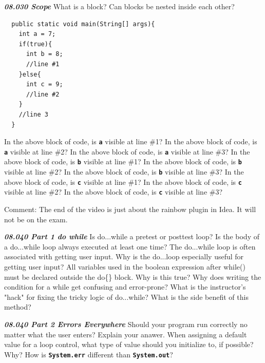 \documentclass[letterpaper,11pt]{exam}
\newcommand{\videoheading}[1]{\Large\textbf{\textit{#1}}}
\begin{document}
\begin{questions}
\videoheading{08.030 Scope}
\question What is a block?
\question Can blocks be nested inside each other?
\begin{samepage}
\begin{verbatim}
  public static void main(String[] args){
    int a = 7;
    if(true){
      int b = 8;
      //line #1
    }else{
      int c = 9;
      //line #2
    }
    //line 3
  }
\end{verbatim}
\question In the above block of code, is \texttt{\textbf{a}} visible at line \#1?
\question In the above block of code, is \texttt{\textbf{a}} visible at line \#2?
\question In the above block of code, is \texttt{\textbf{a}} visible at line \#3?
\question In the above block of code, is \texttt{\textbf{b}} visible at line \#1?
\question In the above block of code, is \texttt{\textbf{b}} visible at line \#2?
\question In the above block of code, is \texttt{\textbf{b}} visible at line \#3?
\question In the above block of code, is \texttt{\textbf{c}} visible at line \#1?
\question In the above block of code, is \texttt{\textbf{c}} visible at line \#2?
\question In the above block of code, is \texttt{\textbf{c}} visible at line \#3?
\end{samepage}

Comment:  The end of the video is just about the rainbow{} plugin in Idea.  It will not be on the exam.

\videoheading{08.040 Part 1 do while}
\question Is do...while a pretest or posttest loop?
\question Is the body of a do...while loop always executed at least one time?
\question The do...while loop is often associated with getting user input. Why is the do...loop especially useful for getting user input?
\question All variables used in the boolean expression after while() must be declared outside the do\{\} block.  Why is this true?
\vspace{1cm}
\question Why does writing the condition for a while get confusing and error-prone?
\question What is the instructor's "hack" for fixing the tricky logic of do...while?  What is the side benefit of this method?
\vspace{2cm}

\videoheading{08.040 Part 2 Errors Everywhere}
\question Should your program run correctly no matter what the user enters?  Explain your anawer.
\vspace{2cm}
\question When assigning a default value for a loop control, what type of value should you initialize to, if possible?  Why?
\vspace{1cm}
\question How is \texttt{\textbf{System.err}} different than \texttt{\textbf{System.out}}?
\vspace{1cm}


\end{questions}
\end{document}
